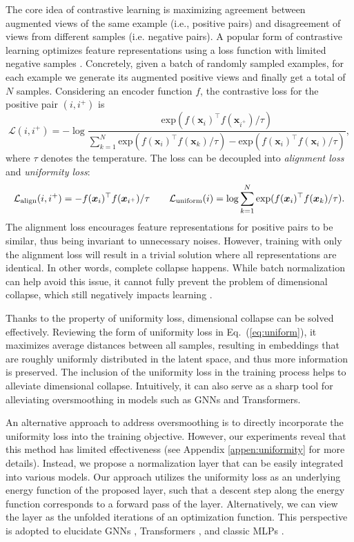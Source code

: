 \documentclass{article}
\def\vx{{\bm{x}}}
\newcommand{\Ls}{\mathcal{L}}
\theoremstyle{definition}
\theoremstyle{remark}
\theoremstyle{theorem}
\begin{document}
The core idea of contrastive learning is maximizing agreement between augmented views of the same example (i.e., positive pairs) and disagreement of views from different samples (i.e. negative pairs). A popular form of contrastive learning optimizes feature representations using a loss function with limited negative samples \citep{chen2020simple}. Concretely, given a batch of randomly sampled examples, for each example we generate its augmented positive views and finally get a total of $N$ samples. Considering an encoder function $f$, the contrastive loss for the positive pair $(i, i^+)$ is 
\begin{equation} \label{eq:infonce}
\Ls(i, i^+) = -\log \frac{\mbox{exp}(f(\vx_i)^{\top}f(\vx_{i^+}) / \tau)}{\sum_{k=1}^{N} \mbox{exp}(f(\vx_i)^{\top}f(\vx_k) / \tau) - \mbox{exp}(f(\vx_i)^{\top}f(\vx_i) / \tau)},
\end{equation}
where $\tau$ denotes the temperature. The loss can be decoupled into \textit{alignment loss} and \textit{uniformity loss}:
\begin{equation} \label{eq:uniform}
    \Ls_{\rm{align}}(i,i^+) = - f(\vx_i)^{\top}f(\vx_{i^+})/\tau \qquad  \Ls_{\rm{uniform}}(i) = \log \sum_{k=1}^N \mbox{exp}(f(\vx_i)^{\top}f(\vx_k)/\tau).
\end{equation}
The alignment loss encourages feature representations for positive pairs to be similar, thus being invariant to unnecessary noises. However, training with only the alignment loss will result in a trivial solution where all representations are identical. In other words, complete collapse happens. While batch normalization \citep{ioffe2015batch} can help avoid this issue, it cannot fully prevent the problem of dimensional collapse, which still negatively impacts learning \citep{hua2021feature}. 

Thanks to the property of uniformity loss, dimensional collapse can be solved effectively. Reviewing the form of uniformity loss in Eq.~(\ref{eq:uniform}), it maximizes average distances between all samples, resulting in embeddings that are roughly uniformly distributed in the latent space, and thus more information is preserved. The inclusion of the uniformity loss in the training process helps to alleviate dimensional collapse. Intuitively, it can also serve as a sharp tool for alleviating oversmoothing in models such as GNNs and Transformers. 

An alternative approach to address oversmoothing is to directly incorporate the uniformity loss into the training objective. However, our experiments reveal that this method has limited effectiveness (see Appendix \ref{appen:uniformity} for more details). Instead, we propose a normalization layer that can be easily integrated into various models. Our approach utilizes the uniformity loss as an underlying energy function of the proposed layer, such that a descent step along the energy function corresponds to a forward pass of the layer. Alternatively, we can view the layer as the unfolded iterations of an optimization function. This perspective is adopted to elucidate GNNs \citep{yang2021graph, zhu2021interpreting}, Transformers \citep{yang2022transformers}, and classic MLPs \citep{xie2021optimization}. 
\end{document}
